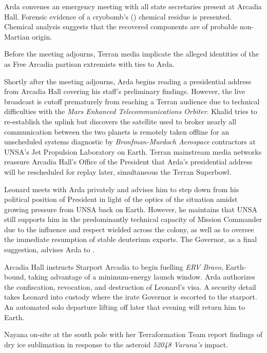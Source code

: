 Arda convenes an emergency meeting with all state secretaries present at Arcadia Hall. Forensic evidence of a cryobomb's () chemical residue is presented. Chemical analysis suggests that the recovered components are of probable non-Martian origin. 

Before the meeting adjourns, Terran media implicate the alleged identities of the  as Free Arcadia partisan extremists with ties to Arda.

Shortly after the meeting adjourns, Arda begins reading a presidential address from Arcadia Hall covering his staff's preliminary findings. However, the live broadcast is cutoff prematurely from reaching a Terran audience due to technical difficulties with the {\it Mars Enhanced Telecommunications Orbiter}. Khalid tries to re-establish the uplink but discovers the satellite used to broker nearly all communication between the two planets is remotely taken offline for an unscheduled systems diagnostic by {\it Bronfman-Murdoch Aerospace} contractors at UNSA's Jet Propulsion Laboratory on Earth. Terran mainstream media networks reassure Arcadia Hall's Office of the President that Arda's presidential address will be rescheduled for replay later, simultaneous the Terran Superbowl.

Leonard meets with Arda privately and advises him to step down from his political position of President in light of the optics of the situation amidst growing pressure from UNSA back on Earth. However, he maintains that UNSA still supports him in the predominantly technical capacity of Mission Commander due to the influence and respect wielded across the colony, as well as to oversee the immediate resumption of stable deuterium exports. The Governor, as a final suggestion, advises Arda to .
\StopTimelineDate

Arcadia Hall instructs Starport Arcadia to begin fuelling {\it ERV Bravo}, Earth-bound, taking advantage of a minimum-energy launch window. Arda authorizes the confiscation, revocation, and destruction of Leonard's visa. A security detail takes Leonard into custody where the irate Governor is escorted to the starport. An automated solo departure lifting off later that evening will return him to Earth.
\StopTimelineDate

Nayana on-site at the south pole with her Terraformation Team report findings of dry ice sublimation in response to the asteroid {\it 52048 Varuna's} impact.
\StopTimelineDate

